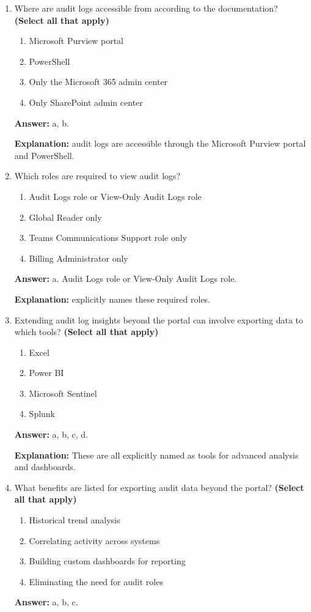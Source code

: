 \documentclass[10pt]{article}
\begin{document}
\begin{enumerate}[leftmargin=*]
\item Where are audit logs accessible from according to the documentation? \textbf{(Select all that apply)}
\begin{enumerate}[label=\alph*., leftmargin=1.5em]
\item Microsoft Purview portal
\item PowerShell
\item Only the Microsoft 365 admin center
\item Only SharePoint admin center
\end{enumerate}
\textbf{Answer:} a, b.

\textbf{Explanation:} audit logs are accessible through the Microsoft Purview portal and PowerShell.

\item Which roles are required to view audit logs?
\begin{enumerate}[label=\alph*., leftmargin=1.5em]
\item Audit Logs role or View-Only Audit Logs role
\item Global Reader only
\item Teams Communications Support role only
\item Billing Administrator only
\end{enumerate}
\textbf{Answer:} a. Audit Logs role or View-Only Audit Logs role.

\textbf{Explanation:} explicitly names these required roles.

\item Extending audit log insights beyond the portal can involve exporting data to which tools? \textbf{(Select all that apply)}
\begin{enumerate}[label=\alph*., leftmargin=1.5em]
\item Excel
\item Power BI
\item Microsoft Sentinel
\item Splunk
\end{enumerate}
\textbf{Answer:} a, b, c, d.

\textbf{Explanation:} These are all explicitly named as tools for advanced analysis and dashboards.

\item What benefits are listed for exporting audit data beyond the portal? \textbf{(Select all that apply)}
\begin{enumerate}[label=\alph*., leftmargin=1.5em]
\item Historical trend analysis
\item Correlating activity across systems
\item Building custom dashboards for reporting
\item Eliminating the need for audit roles
\end{enumerate}
\textbf{Answer:} a, b, c.


\end{enumerate}
\end{document}
